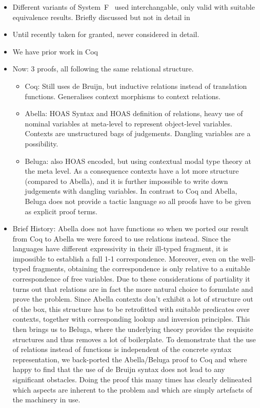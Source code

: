 \documentclass[a4paper,UKenglish]{lipics-v2016}
\begin{document}
\begin{itemize}
\item Different variants of System~F~\cite{Girard1972, DBLP:conf/programm/Reynolds74} used interchangable, only valid with suitable equivalence results.
  Briefly discussed but not in detail in~\cite{Geuvers1993}
\item Until recently taken for granted, never considered in detail.
\item We have prior work in Coq \cite{KaiserEtAl:2017:sysf_pts_equiv_coq}
\item Now: 3 proofs, all following the same relational structure.
  \begin{itemize}
  \item Coq: Still uses de Bruijn, but inductive relations instead of translation functions.
    Generalises context morphisms to context relations.
  \item Abella: HOAS Syntax and HOAS definition of relations, heavy use of nominal variables at meta-level to represent object-level variables.
    Contexts are unstructured bags of judgements.
    Dangling variables are a possibility.
  \item Beluga: also HOAS encoded, but using contextual modal type theory at the meta level.
    As a consequence contexts have a lot more structure (compared to Abella), and it is further impossible to write down judgements with dangling variables.
    In contrast to Coq and Abella, Beluga does not provide a tactic language so all proofs have to be given as explicit proof terms.
  \end{itemize}
\item Brief History: Abella does not have functions so when we ported our result from Coq to Abella we were forced to use relations instead.
  Since the languages have different expressivity in their ill-typed fragment, it is impossible to establish a full 1-1 correspondence.
  Moreover, even on the well-typed fragments, obtaining the correspondence is only relative to a suitable correspondence of free variables.
  Due to these considerations of partiality it turns out that relations are in fact the more natural choice to formulate and prove the problem.
  Since Abella contexts don't exhibit a lot of structure out of the box, this structure has to be retrofitted with suitable predicates over contexts, together with corresponding lookup and inversion principles.
  This then brings us to Beluga, where the underlying theory provides the requisite structures and thus removes a lot of boilerplate.
  To demonstrate that the use of relations instead of functions is independent of the concrete syntax representation, we back-ported the Abella/Beluga proof to Coq and where happy to find that the use of de Bruijn syntax does not lead to any significant obstacles.
  Doing the proof this many times has clearly delineated which aspects are inherent to the problem and which are simply artefacts of the machinery in use.
\end{itemize}
\end{document}
